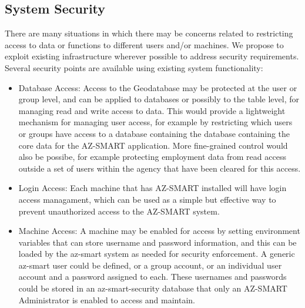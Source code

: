 \subsection{System Security}
There are many situations in which there may be concerns related to restricting access to data or functions to different users and/or machines.  We propose to exploit existing infrastructure wherever possible to address security requirements.  Several security points are available using existing system functionality:


\begin{itemize}
\item Database Access: Access to the Geodatabase may be protected at the user or group level, and can be applied to databases or possibly to the table level, for managing read and write access to data.  This would provide a lightweight mechanism for managing user access, for example by restricting which users or groups have access to a database containing the database containing the core data for the AZ-SMART application.  More fine-grained control would also be possibe, for example protecting employment data from read access outside a set of users within the agency that have been cleared for this access.

\item Login Access: Each machine that has AZ-SMART installed will have login access managament, which can be used as a simple but effective way to prevent unauthorized access to the AZ-SMART system.

\item Machine Access: A machine may be enabled for access by setting environment variables that can store username and password information, and this can be loaded by the az-smart system as needed for security enforcement.  A generic az-smart user could be defined, or a group account, or an individual user account and a password assigned to each.  These usernames and passwords could be stored in an az-smart-security database that only an AZ-SMART Administrator is enabled to access and maintain.

\end{itemize}
